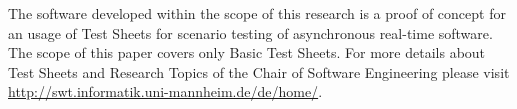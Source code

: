 The software developed within the scope of this research is a proof of concept for an usage of Test Sheets for scenario testing of asynchronous real-time software. The scope of this paper covers only Basic Test Sheets. For more details about Test Sheets and Research Topics of the Chair of Software Engineering please visit \url{http://swt.informatik.uni-mannheim.de/de/home/}.



